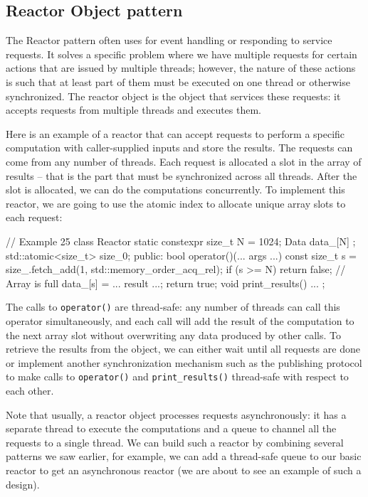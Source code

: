 \subsection{Reactor Object pattern}

The Reactor pattern often uses for event handling or responding to service requests. It solves a specific problem where we have multiple requests for certain actions that are issued by multiple threads; however, the nature of these actions is such that at least part of them must be executed on one thread or otherwise synchronized. The reactor object is the object that services these requests: it accepts requests from multiple threads and executes them.

Here is an example of a reactor that can accept requests to perform a specific computation with caller-supplied inputs and store the results. The requests can come from any number of threads. Each request is allocated a slot in the array of results -- that is the part that must be synchronized across all threads. After the slot is allocated, we can do the computations concurrently. To implement this reactor, we are going to use the atomic index to allocate unique array slots to each request:

\begin{code}
// Example 25
class Reactor {
  static constexpr size_t N = 1024;
  Data data_[N] {};
  std::atomic<size_t> size_{0};
  public:
  bool operator()(... args ...) {
    const size_t s =
      size_.fetch_add(1, std::memory_order_acq_rel);
    if (s >= N) return false;  // Array is full
    data_[s] = ... result ...;
    return true;
  }
  void print_results() { ... }
};
\end{code}

The calls to \texttt{operator()} are thread-safe: any number of threads can call this operator simultaneously, and each call will add the result of the computation to the next array slot without overwriting any data produced by other calls. To retrieve the results from the object, we can either wait until all requests are done or implement another synchronization mechanism such as the publishing protocol to make calls to \texttt{operator()} and \texttt{print\_results()} thread-safe with respect to each other.

Note that usually, a reactor object processes requests asynchronously: it has a separate thread to execute the computations and a queue to channel all the requests to a single thread. We can build such a reactor by combining several patterns we saw earlier, for example, we can add a thread-safe queue to our basic reactor to get an asynchronous reactor (we are about to see an example of such a design).

